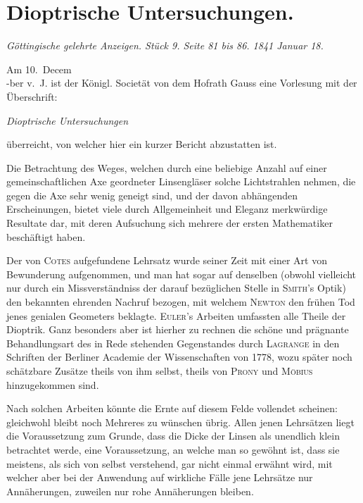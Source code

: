 \documentclass[12pt,a4paper]{article}
\begin{document}
\section*{Dioptrische Untersuchungen.}

\textit{Göttingische gelehrte Anzeigen. Stück 9. Seite 81 bis 86. 1841 Januar 18.}

\bigskip

Am 10.~Decem\\-ber v.~J. ist der Königl. Societät von dem Hofrath Gauss eine Vorlesung mit der Überschrift:

\begin{center}
    \textit{Dioptrische Untersuchungen}
\end{center}

überreicht, von welcher hier ein kurzer Bericht abzustatten ist.

Die Betrachtung des Weges, welchen durch eine beliebige Anzahl auf einer gemeinschaftlichen Axe geordneter Linsengläser solche Lichtstrahlen nehmen, die gegen die Axe sehr wenig geneigt sind, und der davon abhängenden Erscheinungen, bietet viele durch Allgemeinheit und Eleganz merkwürdige Resultate dar, mit deren Aufsuchung sich mehrere der ersten Mathematiker beschäftigt haben.

Der von \textsc{Cotes} aufgefundene Lehrsatz wurde seiner Zeit mit einer Art von Bewunderung aufgenommen, und man hat sogar auf denselben (obwohl vielleicht nur durch ein Missverständniss der darauf bezüglichen Stelle in \textsc{Smith}'s Optik) den bekannten ehrenden Nachruf bezogen, mit welchem \textsc{Newton} den frühen Tod jenes genialen Geometers beklagte. \textsc{Euler}'s Arbeiten umfassten alle Theile der Dioptrik. Ganz besonders aber ist hierher zu rechnen die schöne und prägnante Behandlungsart des in Rede stehenden Gegenstandes durch \textsc{Lagrange} in den Schriften der Berliner Academie der Wissenschaften von 1778, wozu später noch schätzbare Zusätze theils von ihm selbst, theils von \textsc{Prony} und \textsc{Möbius} hinzugekommen sind.

Nach solchen Arbeiten könnte die Ernte auf diesem Felde vollendet scheinen: gleichwohl bleibt noch Mehreres zu wünschen übrig. Allen jenen Lehrsätzen liegt die Voraussetzung zum Grunde, dass die Dicke der Linsen als unendlich klein betrachtet werde, eine Voraussetzung, an welche man so gewöhnt ist, dass sie meistens, als sich von selbst verstehend, gar nicht einmal erwähnt wird, mit welcher aber bei der Anwendung auf wirkliche Fälle jene Lehrsätze nur Annäherungen, zuweilen nur rohe Annäherungen bleiben.
\end{document}

